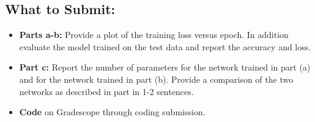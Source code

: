 \documentclass{article}
\begin{document}
\begin{aprob}
    \subsection*{What to Submit:}
    \begin{itemize}
        \item \textbf{Parts a-b:} Provide a plot of the training loss versus epoch. In addition evaluate the model trained on the test data and report the accuracy and loss.
        \item \textbf{Part c:} Report the number of parameters for the network trained in part (a) and for the network trained in part (b).  Provide a comparison of the two networks as described in part in 1-2 sentences.
        \item \textbf{Code} on Gradescope through coding submission.
    \end{itemize}
\end{aprob}
\end{document}

